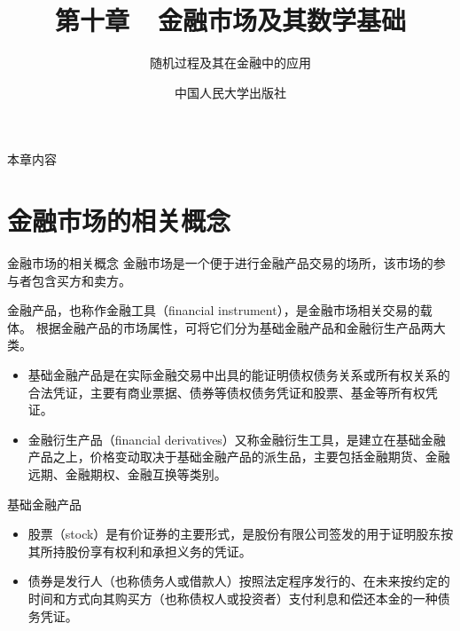 \documentclass[t]{beamer}
\begin{document}
\fontsize{11}{18}\selectfont


\CTEXindent

\title{第十章~~金融市场及其数学基础}
\author{随机过程及其在金融中的应用}
\date{中国人民大学出版社}
\begin{frame}
	\maketitle
\end{frame}



\begin{frame}{本章内容}
	\begin{multicols*}{2}	
		\tableofcontents
	\end{multicols*}


\end{frame}


\section{金融市场的相关概念}

\begin{frame}{金融市场的相关概念}
	金融市场是一个便于进行金融产品交易的场所，该市场的参与者包含买方和卖方。
	
	金融产品，也称作金融工具（financial instrument），是金融市场相关交易的载体。
根据金融产品的市场属性，可将它们分为基础金融产品和金融衍生产品两大类。

\begin{itemize}
	\item 基础金融产品是在实际金融交易中出具的能证明债权债务关系或所有权关系的合法凭证，主要有商业票据、债券等债权债务凭证和股票、基金等所有权凭证。
	\item 金融衍生产品（financial derivatives）又称金融衍生工具，是建立在基础金融产品之上，价格变动取决于基础金融产品的派生品，主要包括金融期货、金融远期、金融期权、金融互换等类别。
\end{itemize}
\end{frame}

\begin{frame}{基础金融产品}
	\begin{itemize}
		\item 股票（stock）是有价证券的主要形式，是股份有限公司签发的用于证明股东按其所持股份享有权利和承担义务的凭证。
		\item 债券是发行人（也称债务人或借款人）按照法定程序发行的、在未来按约定的时间和方式向其购买方（也称债权人或投资者）支付利息和偿还本金的一种债务凭证。
	\end{itemize}
\end{frame}
\end{document}
